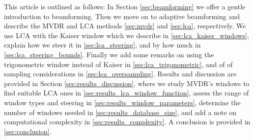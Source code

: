 \documentclass[10pt,journal,draftclsnofoot,onecolumn]{IEEEtran}
\newcommand\1{\vec 1}
\begin{document}
This article is outlined as follows: In Section \ref{sec:beamforming} we offer a gentle introduction to beamforming. Then we move on to adaptive beamforming and describe the MVDR and LCA methods \ref{sec:mvdr} and \ref{sec:lca}, respectively. We use LCA with the Kaiser window which we describe in \ref{sec:lca_kaiser_windows}, explain how we steer it in \ref{sec:lca_steering}, and by how much in \ref{sec:lca_steering_bounds}. Finally we add some remarks on using the trigonometric window instead of Kaiser in \ref{sec:lca_trigonometric}, and of of sampling considerations in \ref{sec:lca_oversampling}. Results and discussion are provided in Section \ref{sec:results_discussion}, where we study MVDR's windows to find suitable LCA ones in \ref{sec:results_lca_window_function}, assess the range of window types and steering in \ref{sec:results_window_parameters}, determine the number of windows needed in \ref{sec:results_database_size}, and add a note on computational complexity in \ref{sec:results_complexity}. A conclusion is provided in \ref{sec:conclusion}.


% 
% 
% 
% 
% 
% 
\end{document}
